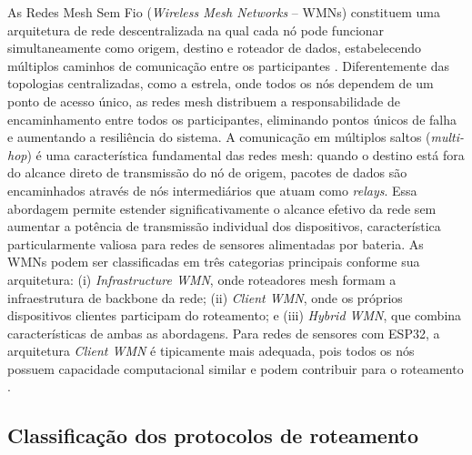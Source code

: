 As Redes Mesh Sem Fio (\emph{Wireless Mesh Networks} -- WMNs) constituem
uma arquitetura de rede descentralizada na qual cada nó pode funcionar
simultaneamente como origem, destino e roteador de dados, estabelecendo
múltiplos caminhos de comunicação entre os participantes
\cite{chaizeng2021}. Diferentemente das topologias centralizadas, como a
estrela, onde todos os nós dependem de um ponto de acesso único, as
redes mesh distribuem a responsabilidade de encaminhamento entre todos
os participantes, eliminando pontos únicos de falha e aumentando a
resiliência do sistema. A comunicação em múltiplos saltos
(\emph{multi-hop}) é uma característica fundamental das redes mesh:
quando o destino está fora do alcance direto de transmissão do nó de
origem, pacotes de dados são encaminhados através de nós intermediários
que atuam como \emph{relays}. Essa abordagem permite estender
significativamente o alcance efetivo da rede sem aumentar a potência de
transmissão individual dos dispositivos, característica particularmente
valiosa para redes de sensores alimentadas por bateria. As WMNs podem
ser classificadas em três categorias principais conforme sua
arquitetura: (i) \emph{Infrastructure WMN}, onde roteadores mesh formam
a infraestrutura de backbone da rede; (ii) \emph{Client WMN}, onde os
próprios dispositivos clientes participam do roteamento; e (iii)
\emph{Hybrid WMN}, que combina características de ambas as abordagens.
Para redes de sensores com ESP32, a arquitetura \emph{Client WMN} é
tipicamente mais adequada, pois todos os nós possuem capacidade
computacional similar e podem contribuir para o roteamento
\cite{chaizeng2021}.

\subsection{Classificação dos protocolos de
roteamento}\label{classificauxe7uxe3o-dos-protocolos-de-roteamento}

